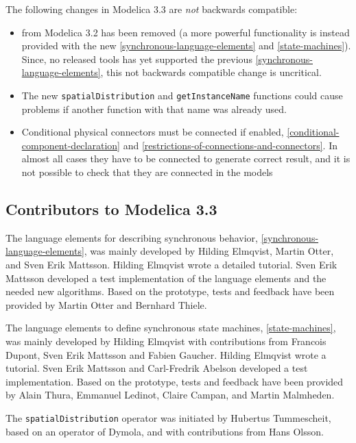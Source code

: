 The following changes in Modelica 3.3 are \emph{not} backwards compatible:
\begin{itemize}
\item
   from
  Modelica 3.2 has been removed (a more powerful functionality is
  instead provided with the new \cref{synchronous-language-elements} and \cref{state-machines}). Since, no
  released tools has yet supported the previous \cref{synchronous-language-elements}, this not
  backwards compatible change is uncritical.
\item
  The new \lstinline!spatialDistribution! and \lstinline!getInstanceName! functions could cause
  problems if another function with that name was already used.
\end{itemize}

\begin{itemize}
\item
  Conditional physical connectors must be connected if enabled,
  \cref{conditional-component-declaration}
  and \cref{restrictions-of-connections-and-connectors}. In almost all cases they have to be connected
  to generate correct result, and it is not possible to check that they
  are connected in the models
\end{itemize}

\subsection{Contributors to Modelica 3.3}\label{contributors-to-modelica-3-3}

The language elements for describing synchronous behavior, \cref{synchronous-language-elements},
was mainly developed by Hilding Elmqvist, Martin Otter, and Sven Erik
Mattsson. Hilding Elmqvist wrote a detailed tutorial. Sven Erik Mattsson
developed a test implementation of the language elements and the needed
new algorithms. Based on the prototype, tests and feedback have been
provided by Martin Otter and Bernhard Thiele.

The language elements to define synchronous state machines, \cref{state-machines},
was mainly developed by Hilding Elmqvist with contributions from
Francois Dupont, Sven Erik Mattsson and Fabien Gaucher. Hilding Elmqvist
wrote a tutorial. Sven Erik Mattsson and Carl-Fredrik Abelson developed
a test implementation. Based on the prototype, tests and feedback have
been provided by Alain Thura, Emmanuel Ledinot, Claire Campan, and
Martin Malmheden.

The \lstinline!spatialDistribution! operator was initiated by Hubertus Tummescheit,
based on an operator of Dymola, and with contributions from Hans Olsson.

